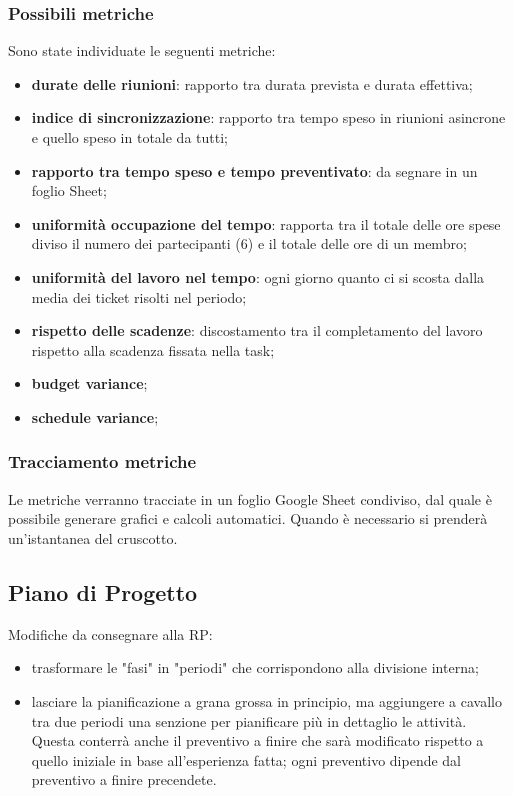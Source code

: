 \subsubsection{Possibili metriche}
Sono state individuate le seguenti metriche:
\begin{itemize}
	\item \textbf{durate delle riunioni}: rapporto tra durata prevista e durata effettiva;
	\item \textbf{indice di sincronizzazione}: rapporto tra tempo speso in riunioni asincrone e quello speso in totale da tutti;
	\item \textbf{rapporto tra tempo speso e tempo preventivato}: da segnare in un foglio Sheet;
	\item \textbf{uniformità occupazione del tempo}: rapporta tra il totale delle ore spese diviso il numero dei partecipanti (6) e il totale delle ore di un membro;
	\item \textbf{uniformità del lavoro nel tempo}: ogni giorno quanto ci si scosta dalla media dei ticket risolti nel periodo;
	\item \textbf{rispetto delle scadenze}: discostamento tra il completamento del lavoro rispetto alla scadenza fissata nella task;
	\item \textbf{budget variance};
	\item \textbf{schedule variance};
\end{itemize}
\subsubsection{Tracciamento metriche}
Le metriche verranno tracciate in un foglio Google Sheet condiviso, dal quale è possibile generare grafici e calcoli automatici. Quando è necessario si prenderà un'istantanea del cruscotto.

\subsection{Piano di Progetto}
Modifiche da consegnare alla RP:
\begin{itemize}
	\item trasformare le "fasi" in "periodi" che corrispondono alla divisione interna;
	\item lasciare la pianificazione a grana grossa in principio, ma aggiungere a cavallo tra due periodi una senzione per pianificare più in dettaglio le attività. Questa conterrà anche il preventivo a finire che sarà modificato rispetto a quello iniziale in base all'esperienza fatta; ogni preventivo dipende dal preventivo a finire precendete.
\end{itemize}

